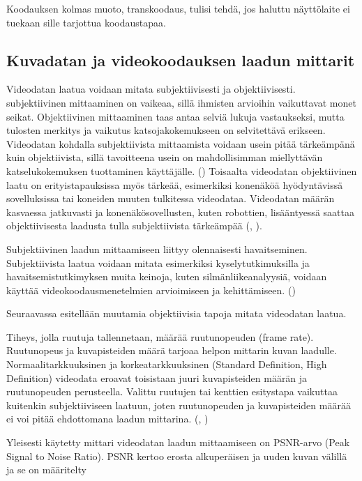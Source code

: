 Koodauksen kolmas muoto, transkoodaus, tulisi tehdä, jos haluttu näyttölaite ei
tuekaan sille tarjottua koodaustapaa.

\subsection{Kuvadatan ja videokoodauksen laadun mittarit}
\label{sec:quality}

Videodatan laatua voidaan mitata subjektiivisesti ja objektiivisesti.
subjektiivinen mittaaminen on vaikeaa, sillä ihmisten arvioihin vaikuttavat
monet seikat. Objektiivinen mittaaminen taas antaa selviä lukuja vastaukseksi,
mutta tulosten merkitys ja vaikutus katsojakokemukseen on selvitettävä erikseen.
Videodatan kohdalla subjektiivista mittaamista voidaan usein pitää tärkeämpänä
kuin objektiivista, sillä tavoitteena usein on mahdollisimman miellyttävän
katselukokemuksen tuottaminen käyttäjälle. (\citealt{h264}) Toisaalta videodatan objektiivinen
laatu on erityistapauksissa myös tärkeää, esimerkiksi konenäköä hyödyntävissä
sovelluksissa tai koneiden muuten tulkitessa videodataa. Videodatan määrän
kasvaessa jatkuvasti ja konenäkösovellusten, kuten robottien, lisääntyessä
saattaa objektiivisesta laadusta tulla subjektiivista tärkeämpää (\citealt{youtube},
\citealt{cisco}).

Subjektiivinen laadun mittaamiseen liittyy olennaisesti havaitseminen.
Subjektiivista laatua voidaan mitata esimerkiksi kyselytutkimuksilla ja
havaitsemistutkimyksen muita keinoja, kuten silmänliikeanalyysiä, voidaan
käyttää videokoodausmenetelmien arvioimiseen ja kehittämiseen. (\citealt{perception})

Seuraavassa esitellään muutamia objektiivisia tapoja mitata videodatan laatua.

Tiheys, jolla ruutuja tallennetaan, määrää ruutunopeuden (frame rate).
Ruutunopeus ja kuvapisteiden määrä tarjoaa helpon mittarin kuvan laadulle.
Normaalitarkkuuksinen ja korkeatarkkuuksinen (Standard Definition, High
Definition) videodata eroavat toisistaan juuri kuvapisteiden määrän ja
ruutunopeuden perusteella. Valittu ruutujen tai kenttien esitystapa vaikuttaa
kuitenkin subjektiiviseen laatuun, joten ruutunopeuden ja kuvapisteiden määrää
ei voi pitää ehdottomana laadun mittarina. (\citealt{h264}, \citealt{du})

Yleisesti käytetty mittari videodatan laadun mittaamiseen on PSNR-arvo (Peak
Signal to Noise Ratio). PSNR kertoo erosta alkuperäisen ja uuden kuvan välillä
ja se on määritelty

